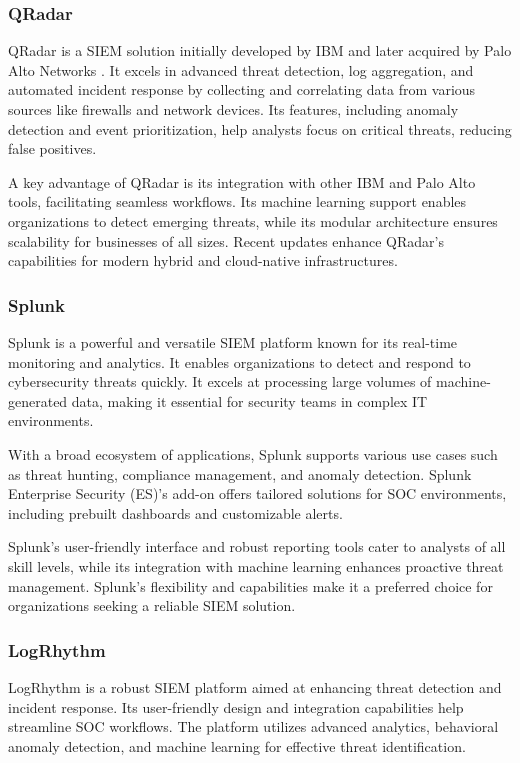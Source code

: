 \subsubsection{QRadar}
QRadar is a SIEM solution initially developed by IBM and later acquired by Palo Alto Networks \parencite{paloalto2024}. 
It excels in advanced threat detection, log aggregation, and automated incident response by collecting and correlating data from various sources like firewalls and network devices. Its features, including anomaly detection and event prioritization, help analysts focus on critical threats, reducing false positives.

A key advantage of QRadar is its integration with other IBM and Palo Alto tools, facilitating seamless workflows. 
Its machine learning support enables organizations to detect emerging threats, while its modular architecture ensures scalability for businesses of all sizes. 
Recent updates enhance QRadar's capabilities for modern hybrid and cloud-native infrastructures.

\subsubsection{Splunk}
Splunk is a powerful and versatile SIEM platform known for its real-time monitoring and analytics. 
It enables organizations to detect and respond to cybersecurity threats quickly. 
It excels at processing large volumes of machine-generated data, making it essential for security teams in complex IT environments.

With a broad ecosystem of applications, Splunk supports various use cases such as threat hunting, compliance management, and anomaly detection. 
Splunk Enterprise Security (ES)'s add-on offers tailored solutions for SOC environments, including prebuilt dashboards and customizable alerts. 

Splunk's user-friendly interface and robust reporting tools cater to analysts of all skill levels, while its integration with machine learning enhances proactive threat management. 
Splunk's flexibility and capabilities make it a preferred choice for organizations seeking a reliable SIEM solution.

\subsubsection{LogRhythm}
LogRhythm is a robust SIEM platform aimed at enhancing threat detection and incident response. 
Its user-friendly design and integration capabilities help streamline SOC workflows. 
The platform utilizes advanced analytics, behavioral anomaly detection, and machine learning for effective threat identification. 

